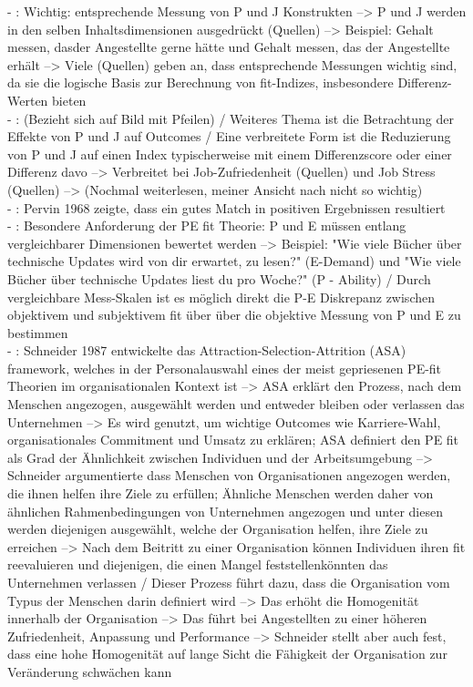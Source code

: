 \newpage
- \cite[S. 4]{edwards:1991}: Wichtig: entsprechende Messung von P und J Konstrukten --> P und J werden in den selben Inhaltsdimensionen ausgedrückt (Quellen) --> Beispiel: Gehalt messen, dasder Angestellte gerne hätte und Gehalt messen, das der Angestellte erhält --> Viele (Quellen) geben an, dass entsprechende Messungen wichtig sind, da sie die logische Basis zur Berechnung von fit-Indizes, insbesondere Differenz-Werten bieten \\
- \cite[S. 4]{edwards:1991}: (Bezieht sich auf Bild mit Pfeilen) / Weiteres Thema ist die Betrachtung der Effekte von P und J auf Outcomes / Eine verbreitete Form ist die Reduzierung von P und J auf einen Index typischerweise mit einem Differenzscore oder einer Differenz davo --> Verbreitet bei Job-Zufriedenheit (Quellen) und Job Stress (Quellen) --> (Nochmal weiterlesen, meiner Ansicht nach nicht so wichtig) \\
- \textcite[S. 2]{muchinsky:1987}: Pervin 1968 zeigte, dass ein gutes Match in positiven Ergebnissen resultiert\\
- \cite[S. 5]{caplan:1987}: Besondere Anforderung der PE fit Theorie: P und E müssen entlang vergleichbarer Dimensionen bewertet werden --> Beispiel: "Wie viele Bücher über technische Updates wird von dir erwartet, zu lesen?" (E-Demand) und "Wie viele Bücher über technische Updates liest du pro Woche?" (P - Ability) / Durch vergleichbare Mess-Skalen ist es möglich direkt die P-E Diskrepanz zwischen objektivem und subjektivem fit über über die objektive Messung von P und E zu bestimmen \\
- \cite[S. 4]{su:2015}: Schneider 1987 entwickelte das Attraction-Selection-Attrition (ASA) framework, welches in der Personalauswahl eines der meist gepriesenen PE-fit Theorien im organisationalen Kontext ist --> ASA erklärt den Prozess, nach dem Menschen angezogen, ausgewählt werden und entweder bleiben oder verlassen das Unternehmen --> Es wird genutzt, um wichtige Outcomes wie Karriere-Wahl, organisationales Commitment und Umsatz zu erklären; ASA definiert den PE fit als Grad der Ähnlichkeit zwischen Individuen und der Arbeitsumgebung --> Schneider argumentierte dass Menschen von Organisationen angezogen werden, die ihnen helfen ihre Ziele zu erfüllen; Ähnliche Menschen werden daher von ähnlichen Rahmenbedingungen von Unternehmen angezogen und unter diesen werden diejenigen ausgewählt, welche der Organisation helfen, ihre Ziele zu erreichen --> Nach dem Beitritt zu einer Organisation können Individuen ihren fit reevaluieren und diejenigen, die einen Mangel feststellenkönnten das Unternehmen verlassen / Dieser Prozess führt dazu, dass die Organisation vom Typus der Menschen darin definiert wird --> Das erhöht die Homogenität innerhalb der Organisation --> Das führt bei Angestellten zu einer höheren Zufriedenheit, Anpassung und Performance --> Schneider stellt aber auch fest, dass eine hohe Homogenität auf lange Sicht die Fähigkeit der Organisation zur Veränderung schwächen kann \\
